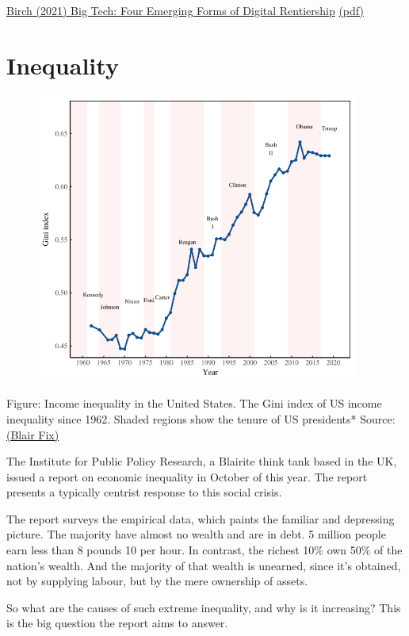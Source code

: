 \documentclass[
]{book}
\begin{document}
\href{https://www.tandfonline.com/doi/full/10.1080/09505431.2021.1932794}{Birch (2021) Big Tech: Four Emerging Forms of Digital Rentiership}
\href{pdf/Birch_2021_Digital_Rentiership.pdf}{(pdf)}

\hypertarget{inequality}{%
\chapter{Inequality}\label{inequality}}

\includegraphics[width=5in,height=3.75in]{fig/fix_gini_us.png}

Figure: Income inequality in the United States.
The Gini index of US income inequality since 1962.
Shaded regions show the tenure of US presidents*
Source:\href{https://economicsfromthetopdown.com/2021/02/26/radically-progressive-degrowth-reducing-resource-use-by-eliminating-inequality/}{(Blair Fix)}

The Institute for Public Policy Research, a Blairite think tank based in the UK, issued a report on economic inequality in October of this year. The report presents a typically centrist response to this social crisis.

The report surveys the empirical data, which paints the familiar and depressing picture. The majority have almost no wealth and are in debt. 5 million people earn less than 8 pounds 10 per hour. In contrast, the richest 10\% own 50\% of the nation's wealth. And the majority of that wealth is unearned, since it's obtained, not by supplying labour, but by the mere ownership of assets.

So what are the causes of such extreme inequality, and why is it increasing? This is the big question the report aims to answer.
\end{document}
